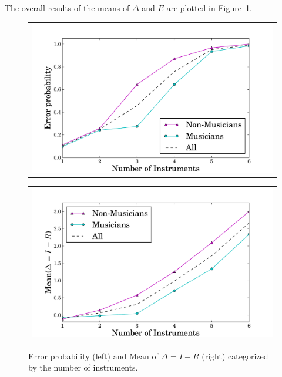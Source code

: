The overall results of the means of $\Delta$ and $E$ are plotted in Figure~\ref{fig:meanerror}.

\begin{figure}[h]
\begin{minipage}{0.5\textwidth}
\begin{tabular}{c}
	\includegraphics[width=\textwidth]{Chapters/07_Analysis_Experiment/images/error_means.pdf}
\end{tabular}
\end{minipage}
\begin{minipage}{0.5\textwidth}
\begin{tabular}{c}
	\includegraphics[width=\textwidth]{Chapters/07_Analysis_Experiment/images/error_diff.pdf}
\end{tabular}
\end{minipage}
\caption{Error probability (left) and Mean of $\Delta = I-R$ (right) categorized by the number of instruments.}
\label{fig:meanerror}
\end{figure}
\vspace{-1.0em}


